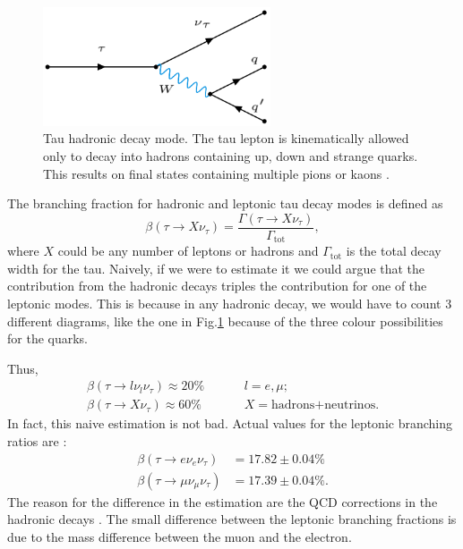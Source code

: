 \begin{figure}[h]
	\centering
	\includegraphics[width=0.6\textwidth]{figures/Fig2}
	\caption{Tau hadronic decay mode. The tau lepton is kinematically allowed only to decay into hadrons containing up, down and strange quarks. This results on final states containing multiple pions or kaons \cite{Davier_2006}.}
	\label{Fig2}
\end{figure}
The branching fraction for hadronic and leptonic tau decay modes is defined as
\begin{equation}
	\beta(\tau\to X\nu_\tau)=\frac{\Gamma(\tau\to X\nu_\tau)}{\Gamma_{\text{tot}}},
\end{equation}
where $X$ could be any number of leptons or hadrons and $\Gamma_{\text{tot}}$ is the total decay width for the tau. Naively, if we were to estimate it we could argue that the contribution from the hadronic decays triples the contribution for one of the leptonic modes. This is because in any hadronic decay, we would have to count 3 different diagrams, like the one in Fig.\ref{Fig2} because of the three colour possibilities for the quarks.

Thus, 
\begin{align}
\beta(\tau\to l\nu_l\nu_\tau)\approx 20\%& \hspace{1cm}l=e,\mu;
\\
\beta(\tau\to X\nu_\tau)\approx 60\%& \hspace{1cm} X=\text{hadrons+neutrinos}.
\end{align}
In fact, this naive estimation is not bad. Actual values for the leptonic branching ratios are \cite{PhysRevD.98.030001}:
\begin{align}
\beta(\tau\to e\nu_e\nu_\tau)&=17.82\pm 0.04\%
\label{eq6}
\\
\beta(\tau\to \mu\nu_\mu\nu_\tau)&=17.39\pm 0.04\%.
\end{align}
The reason for the difference in the estimation are the QCD corrections in the hadronic decays \cite{Pich:2013lsa}. The small difference between the leptonic branching fractions is due to the mass difference between the muon and the electron.

